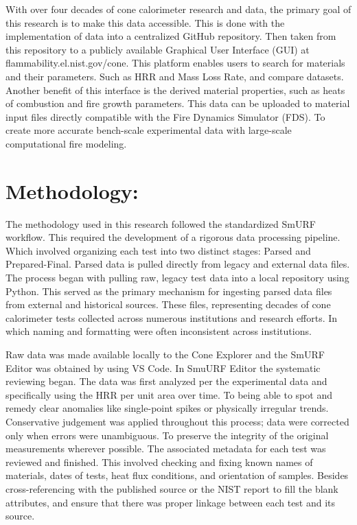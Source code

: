 \documentclass{abstract}
\begin{document}
With over four decades of cone calorimeter research and data, the primary goal of this research is to make this data accessible. This is done with the implementation of data into a centralized GitHub repository. Then taken from this repository to a publicly available Graphical User Interface (GUI) at flammability.el.nist.gov/cone. This platform enables users to search for materials and their parameters. Such as HRR and Mass Loss Rate, and compare datasets. Another benefit of this interface is the derived material properties, such as heats of combustion and fire growth parameters. This data can be uploaded to material input files directly compatible with the Fire Dynamics Simulator (FDS). To create more accurate bench-scale experimental data with large-scale computational fire modeling.



\section{Methodology:}
The methodology used in this research followed the standardized SmURF workflow. This required the development of a rigorous data processing pipeline. Which involved organizing each test into two distinct stages: Parsed and Prepared-Final. Parsed data is pulled directly from legacy and external data files. The process began with pulling raw, legacy test data into a local repository using Python. This served as the primary mechanism for ingesting parsed data files from external and historical sources. These files, representing decades of cone calorimeter tests collected across numerous institutions and research efforts.  In which naming and formatting were often inconsistent across institutions. 

Raw data was made available locally to the Cone Explorer and the SmURF Editor was obtained by using VS Code. In SmuURF Editor the systematic reviewing began. The data was first analyzed per the experimental data and specifically using the HRR per unit area over time. To being able to spot and remedy clear anomalies like single-point spikes or physically irregular trends. Conservative judgement was applied throughout this process; data were corrected only when errors were unambiguous. To preserve the integrity of the original measurements wherever possible. The associated metadata for each test was reviewed and finished. This involved checking and fixing known names of materials, dates of tests, heat flux conditions, and orientation of samples. Besides cross-referencing with the published source or the NIST report to fill the blank attributes, and ensure that there was proper linkage between each test and its source. 
\end{document}
